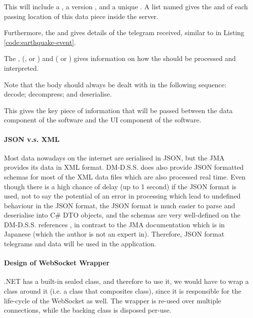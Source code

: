 \begin{itemize}
          This will include a , a version , and a unique . A list named  gives the  and  of each passing location of this data piece inside the server.

          Furthermore, the  and  gives details of the telegram received, similar to in Listing \ref{code:earthquake-event}.

          The ,  (,  or ) and  ( or ) gives information on how the  should be processed and interpreted.

          Note that the body should always be dealt with in the following sequence: decode; decompress; and deserialise.

          This gives the key piece of information that will be passed between the data component of the software and the UI component of the software.
\end{itemize}

\paragraph{JSON v.s. XML}

Most data nowadays on the internet are serialised in JSON, but the JMA provides its data in XML format. DM-D.S.S. does also provide JSON formatted schemas for most of the XML data files which are also processed real time. Even though there is a high chance of delay (up to 1 second) if the JSON format is used, not to say the potential of an error in processing which lead to undefined behaviour in the JSON format, the JSON format is much easier to parse and deserialise into C\# DTO objects, and the schemas are very well-defined on the DM-D.S.S. references \autocite{dmdata-references-json}, in contrast to the JMA documentation \autocite{jma-xml-format} which is in Japanese (which the author is not an expert in). Therefore, JSON format telegrams and data will be used in the application.

\paragraph{Design of WebSocket Wrapper}

.NET has a built-in sealed  class, and therefore to use it, we would have to wrap a class around it (i.e. a class that composites  class), since it is responsible for the life-cycle of the WebSocket as well. The wrapper is re-used over multiple connections, while the backing  class is disposed per-use.

